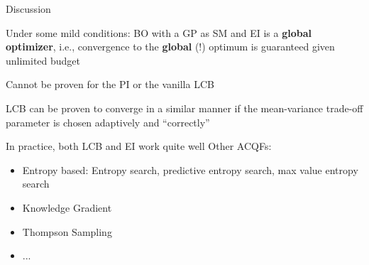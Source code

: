 \documentclass[11pt,compress,t,notes=noshow, xcolor=table]{beamer}
\begin{document}
\begin{framei}{Discussion}
\item Under some mild conditions: BO with a GP as SM and EI is a \textbf{global optimizer}, i.e., convergence to the \textbf{global} (!) optimum is guaranteed given unlimited budget 
\item Cannot be proven for the PI or the vanilla LCB
\item LCB can be proven to converge in a similar manner if the mean-variance trade-off parameter is chosen adaptively and ``correctly'' 
\item In practice, both LCB and EI work quite well
\vfill
Other ACQFs:
\begin{itemize}
\item Entropy based: Entropy search, predictive entropy search, max value entropy search
\item Knowledge Gradient
\item Thompson Sampling
\item ...
\end{itemize}
\end{framei}

\endlecture
\end{document}
